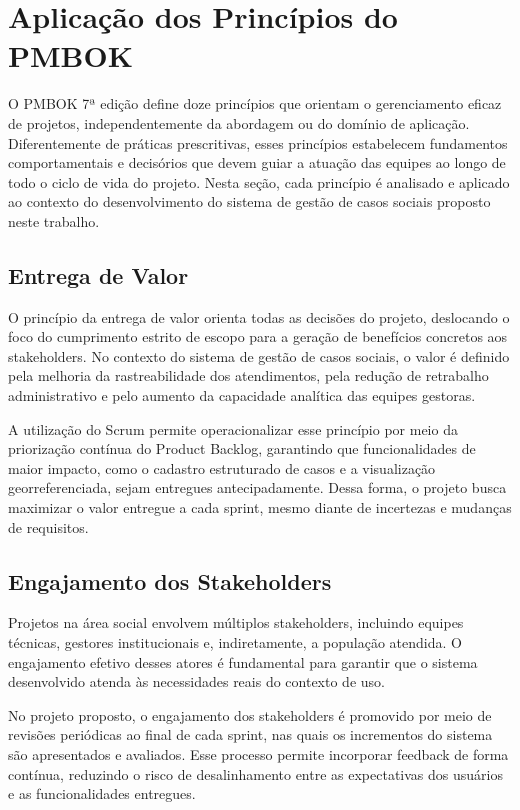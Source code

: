 \chapter{Aplicação dos Princípios do PMBOK}\label{chp:PrincipiosPMBOK}

O PMBOK 7ª edição define doze princípios que orientam o gerenciamento eficaz de projetos, independentemente da abordagem ou do domínio de aplicação. Diferentemente de práticas prescritivas, esses princípios estabelecem fundamentos comportamentais e decisórios que devem guiar a atuação das equipes ao longo de todo o ciclo de vida do projeto. Nesta seção, cada princípio é analisado e aplicado ao contexto do desenvolvimento do sistema de gestão de casos sociais proposto neste trabalho.

\section{Entrega de Valor}

O princípio da entrega de valor orienta todas as decisões do projeto, deslocando o foco do cumprimento estrito de escopo para a geração de benefícios concretos aos stakeholders. No contexto do sistema de gestão de casos sociais, o valor é definido pela melhoria da rastreabilidade dos atendimentos, pela redução de retrabalho administrativo e pelo aumento da capacidade analítica das equipes gestoras.

A utilização do Scrum permite operacionalizar esse princípio por meio da priorização contínua do Product Backlog, garantindo que funcionalidades de maior impacto, como o cadastro estruturado de casos e a visualização georreferenciada, sejam entregues antecipadamente. Dessa forma, o projeto busca maximizar o valor entregue a cada sprint, mesmo diante de incertezas e mudanças de requisitos.

\section{Engajamento dos Stakeholders}

Projetos na área social envolvem múltiplos stakeholders, incluindo equipes técnicas, gestores institucionais e, indiretamente, a população atendida. O engajamento efetivo desses atores é fundamental para garantir que o sistema desenvolvido atenda às necessidades reais do contexto de uso.

No projeto proposto, o engajamento dos stakeholders é promovido por meio de revisões periódicas ao final de cada sprint, nas quais os incrementos do sistema são apresentados e avaliados. Esse processo permite incorporar feedback de forma contínua, reduzindo o risco de desalinhamento entre as expectativas dos usuários e as funcionalidades entregues.

